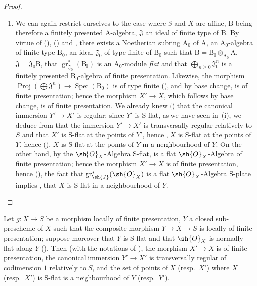 \begin{proof}
\begin{enumerate}[label=(\roman*)]
  \item We can again restrict ourselves to the case where $S$ and $X$ are affine, $\mathrm{B}$ being therefore a finitely presented $\mathrm{A}$-algebra, $\mathfrak{J}$ an ideal of finite type of $\mathrm{B}$.
By virtue of (), () and , there exists a Noetherian subring $\mathrm{A}_0$ of $\mathrm{A}$, an $\mathrm{A}_0$-algebra of finite type $\mathrm{B}_0$, an ideal $\mathfrak{J}_0$ of type finite of $\mathrm{B}_0$ such that $\mathrm{B}=\mathrm{B}_0\otimes_{\mathrm{A}_0}\mathrm{A}$, $\mathfrak{J}=\mathfrak{J}_0\mathrm{B}$, that $\operatorname{gr}_{\mathfrak{J}_0}^*(\mathrm{B}_0)$ is an $\mathrm{A}_0$-module \emph{flat} and that $\bigoplus_{n\geq 0}\mathfrak{J}_0^n$ is a finitely presented $\mathrm{B}_0$-algebra of finite presentation.
Likewise, the morphism $\operatorname{Proj}(\bigoplus\mathfrak{J}^n)\to\operatorname{Spec}(\mathrm{B}_0)$ is of type finite (), and by base change, is of finite presentation; hence the morphism $X'\to X$, which follows by base change, is of finite presentation.
We already knew () that the canonical immersion $Y'\to X'$ is regular; since $Y'$ is S-flat, as we have seen in~(i), we deduce from  that the immersion $Y'\to X'$ is transversally regular relatively to $S$ and that $X'$ is S-flat at the points of $Y'$, hence , $X$ is S-flat at the points of $Y$, hence (), $X$ is S-flat at the points of $Y$ in a neighbourhood of $Y$.
On the other hand, by the $\sh{O}_X$-Algebra S-flat, is a flat $\sh{O}_X$-Algebra of finite presentation; hence the morphism $X'\to X$ is of finite presentation, hence (), the fact that $\operatorname{gr}_\sh{J}^*(\sh{O}_X)$ is a flat $\sh{O}_X$-Algebra S-plate implies , that $X$ is S-flat in a neighbourhood of $Y$.
\end{enumerate}
\end{proof}

\begin{corollary}[19.4.7]
\label{IV.19.4.7}
Let $g:X\to S$ be a morphism locally of finite presentation, $Y$ a closed sub-prescheme of $X$ such that the composite morphism $Y\to X\to S$ is locally of finite presentation; suppose moreover that $Y$ is S-flat and that $\sh{O}_X$ is normally flat along $Y$ ().
Then (with the notations of ), the morphism $X'\to X$ is of finite presentation, the canonical immersion $Y'\to X'$ is transversally regular of codimension $1$ relatively to $S$, and the set of points of $X$ (resp.\ $X'$) where $X$ (resp.\ $X'$) is S-flat is a neighbourhood of $Y$ (resp.\ $Y'$).
\end{corollary}

